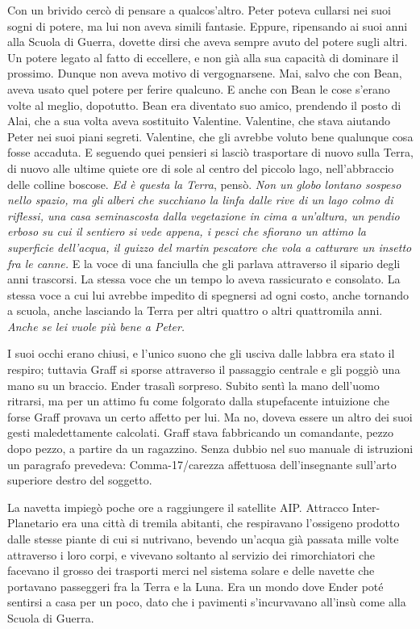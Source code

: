{Con un brivido cercò di pensare a qualcos'altro. Peter poteva cullarsi
	nei suoi sogni di potere, ma lui non aveva simili fantasie. Eppure,
	ripensando ai suoi anni alla Scuola di Guerra, dovette dirsi che aveva
	sempre avuto del potere sugli altri. Un potere legato al fatto di
	eccellere, e non già alla sua capacità di dominare il prossimo. Dunque
	non aveva motivo di vergognarsene. Mai, salvo che con Bean, aveva usato
	quel potere per ferire qualcuno. E anche con Bean le cose s'erano volte
	al meglio, dopotutto. Bean era diventato suo amico, prendendo il posto
	di Alai, che a sua volta aveva sostituito Valentine. Valentine, che
	stava aiutando Peter nei suoi piani segreti. Valentine, che gli avrebbe
	voluto bene qualunque cosa fosse accaduta. E seguendo quei pensieri si
	lasciò trasportare di nuovo sulla Terra, di nuovo alle ultime quiete ore
	di sole al centro del piccolo lago, nell'abbraccio delle colline
	boscose. \emph{Ed è questa la Terra}, \emph{} pensò. \emph{Non un globo
		lontano sospeso nello spazio, ma gli alberi che succhiano la linfa dalle
		rive di un lago colmo di riflessi, una casa seminascosta dalla
		vegetazione in cima a un'altura, un pendio erboso su cui il sentiero si
		vede appena, i pesci che sfiorano un attimo la superficie dell'acqua, il
		guizzo del martin pescatore che vola a catturare un insetto fra le
		canne.} E la voce di una fanciulla che gli parlava attraverso il sipario
	degli anni trascorsi. La stessa voce che un tempo lo aveva rassicurato e
	consolato. La stessa voce a cui lui avrebbe impedito di spegnersi ad
	ogni costo, anche tornando a scuola, anche lasciando la Terra per altri
	quattro o altri quattromila anni. \emph{Anche se lei vuole più bene a
		Peter.}}

{I suoi occhi erano chiusi, e l'unico suono che gli usciva dalle labbra
	era stato il respiro; tuttavia Graff si sporse attraverso il passaggio
	centrale e gli poggiò una mano su un braccio. Ender trasalì sorpreso.
	Subito sentì la mano dell'uomo ritrarsi, ma per un attimo fu come
	folgorato dalla stupefacente intuizione che forse Graff provava un certo
	affetto per lui. Ma no, doveva essere un altro dei suoi gesti
	maledettamente calcolati. Graff stava fabbricando un comandante, pezzo
	dopo pezzo, a partire da un ragazzino. Senza dubbio nel suo manuale di
	istruzioni un paragrafo prevedeva: Comma-17/carezza affettuosa
	dell'insegnante sull'arto superiore destro del soggetto.}

{La navetta impiegò poche ore a raggiungere il satellite AIP. Attracco
	Inter-Planetario era una città di tremila abitanti, che respiravano
	l'ossigeno prodotto dalle stesse piante di cui si nutrivano, bevendo
	un'acqua già passata mille volte attraverso i loro corpi, e vivevano
	soltanto al servizio dei rimorchiatori che facevano il grosso dei
	trasporti merci nel sistema solare e delle navette che portavano
	passeggeri fra la Terra e la Luna. Era un mondo dove Ender poté sentirsi
	a casa per un poco, dato che i pavimenti s'incurvavano all'insù come
	alla Scuola di Guerra.}

